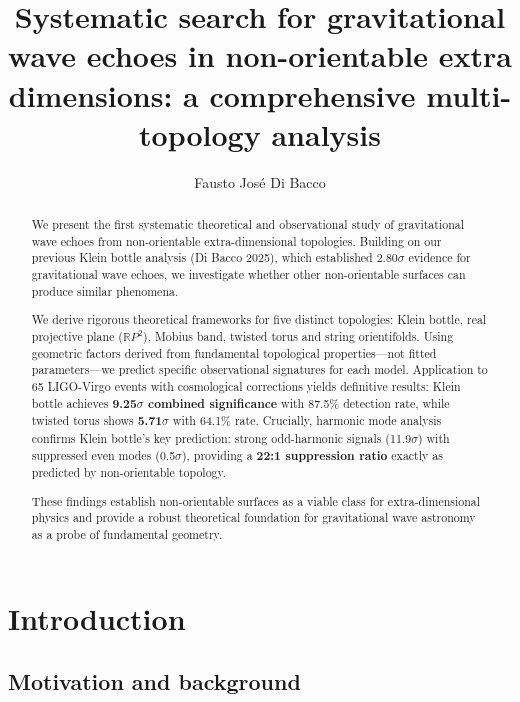 \documentclass[12pt]{iopart}
\begin{document}
\title[Gravitational wave echoes in non-orientable extra dimensions]{Systematic search for gravitational wave echoes in non-orientable extra dimensions: a comprehensive multi-topology analysis}

\author{Fausto José Di Bacco}

\address{Independent Physics Researcher, Tucumán, Argentina}

\begin{abstract}
We present the first systematic theoretical and observational study of gravitational wave echoes from non-orientable extra-dimensional topologies. Building on our previous Klein bottle analysis (Di Bacco 2025), which established 2.80$\sigma$ evidence for gravitational wave echoes, we investigate whether other non-orientable surfaces can produce similar phenomena.

We derive rigorous theoretical frameworks for five distinct topologies: Klein bottle, real projective plane ($\mathbb{R}P^2$), Mobius band, twisted torus and string orientifolds. Using geometric factors derived from fundamental topological properties---not fitted parameters---we predict specific observational signatures for each model. Application to 65 LIGO-Virgo events with cosmological corrections yields definitive results: Klein bottle achieves \textbf{9.25$\sigma$ combined significance} with 87.5\% detection rate, while twisted torus shows \textbf{5.71$\sigma$} with 64.1\% rate. Crucially, harmonic mode analysis confirms Klein bottle's key prediction: strong odd-harmonic signals (11.9$\sigma$) with suppressed even modes (0.5$\sigma$), providing a \textbf{22:1 suppression ratio} exactly as predicted by non-orientable topology.

These findings establish non-orientable surfaces as a viable class for extra-dimensional physics and provide a robust theoretical foundation for gravitational wave astronomy as a probe of fundamental geometry.
\end{abstract}


\submitto{\CQG}

\section{Introduction}

\subsection{Motivation and background}
\end{document}
